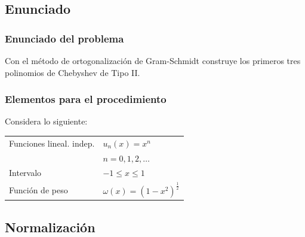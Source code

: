 \documentclass[12pt]{beamer}
\begin{document}
\subsection{Enunciado}

\begin{frame}
\frametitle{Enunciado del problema}
Con el método de ortogonalización de Gram-Schmidt construye los primeros tres polinomios de Chebyshev de Tipo II.
\end{frame}
\begin{frame}
\frametitle{Elementos para el procedimiento}
Considera lo siguiente:
\pause
\begin{table}
\begin{tabular}{l l}
Funciones lineal. indep. & $u_{n}(x) = x^{n}$ \\
 & $n = 0, 1, 2, \ldots$ \\ \pause
Intervalo & $-1 \leq x \leq 1$ \\ \pause
Función de peso & $\omega (x) = (1 -x^{2})^{\frac{1}{2}}$
\end{tabular}
\end{table}
\end{frame}

\subsection{Normalización}
\end{document}
